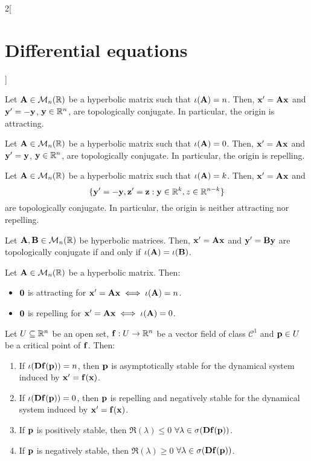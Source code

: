 \documentclass[../../../main_math.tex]{subfiles}
\begin{document}
\begin{multicols}{2}[\section{Differential equations}]
\begin{theorem}
    Let $\vf{A}\in\mathcal{M}_n(\RR)$ be a hyperbolic matrix such that $\iota(\vf{A})=n$. Then, $\vf{x}'=\vf{A}\vf{x}$ and $\vf{y}'=-\vf{y}$, $\vf{y}\in\RR^n$, are topologically conjugate. In particular, the origin is attracting.
  \end{theorem}
  \begin{corollary}
    Let $\vf{A}\in\mathcal{M}_n(\RR)$ be a hyperbolic matrix such that $\iota(\vf{A})=0$. Then, $\vf{x}'=\vf{A}\vf{x}$ and $\vf{y}'=\vf{y}$, $\vf{y}\in\RR^n$, are topologically conjugate. In particular, the origin is repelling.
  \end{corollary}
  \begin{corollary}
    Let $\vf{A}\in\mathcal{M}_n(\RR)$ be a hyperbolic matrix such that $\iota(\vf{A})=k$. Then, $\vf{x}'=\vf{A}\vf{x}$ and $$\{\vf{y}'=-\vf{y}, \vf{z}'=\vf{z}:\vf{y}\in\RR^k,{z}\in\RR^{n-k}\}$$ are topologically conjugate. In particular, the origin is neither attracting nor repelling.
  \end{corollary}
  \begin{theorem}
    Let $\vf{A},\vf{B}\in\mathcal{M}_n(\RR)$ be hyperbolic matrices. Then, $\vf{x}'=\vf{A}\vf{x}$ and $\vf{y}'=\vf{B}\vf{y}$ are topologically conjugate if and only if $\iota(\vf{A})=\iota(\vf{B})$.
  \end{theorem}
  \begin{corollary}
    Let $\vf{A}\in\mathcal{M}_n(\RR)$ be a hyperbolic matrix. Then:
    \begin{itemize}
      \item $\vf{0}$ is attracting for $\vf{x}'=\vf{A}\vf{x}\iff\iota(\vf{A})=n$.
      \item $\vf{0}$ is repelling for $\vf{x}'=\vf{A}\vf{x}\iff\iota(\vf{A})=0$.
    \end{itemize}
  \end{corollary}
  \begin{theorem}
    Let $U\subseteq \RR^n$ be an open set, $\vf{f}:U\rightarrow\RR^n$ be a vector field of class $\mathcal{C}^1$ and $\vf{p}\in U$ be a critical point of $\vf{f}$. Then:
    \begin{enumerate}
      \item If $\iota(\vf{Df}(\vf{p}))=n$, then $\vf{p}$ is asymptotically stable for the dynamical system induced by $\vf{x}'=\vf{f}(\vf{x})$.
      \item If $\iota(\vf{Df}(\vf{p}))=0$, then $\vf{p}$ is repelling and negatively stable for the dynamical system induced by $\vf{x}'=\vf{f}(\vf{x})$.
      \item If $\vf{p}$ is positively stable, then $\Re(\lambda)\leq 0$ $\forall\lambda\in\sigma(\vf{Df}(\vf{p}))$.
      \item If $\vf{p}$ is negatively stable, then $\Re(\lambda)\geq 0$ $\forall\lambda\in\sigma(\vf{Df}(\vf{p}))$.
    \end{enumerate}
  \end{theorem}

\end{multicols}
\end{document}
